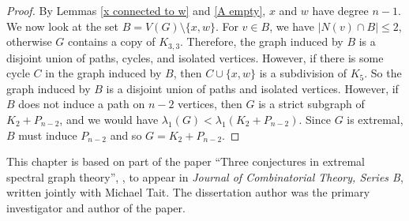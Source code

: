 \begin{proof}
By Lemmas \ref{x connected to w} and \ref{A empty}, $x$ and $w$ have degree $n-1$. We now look at the set $B = V(G) \setminus \{x,w\}$. For $v\in B$, we have $|N(v) \cap B| \leq 2$, otherwise $G$ contains a copy of $K_{3,3}$. Therefore, the graph induced by $B$ is a disjoint union of paths, cycles, and isolated vertices. However, if there is some cycle $C$ in the graph induced by $B$, then $C \cup\{x,w\}$ is a subdivision of $K_5$. So the graph induced by $B$ is a disjoint union of paths and isolated vertices. However, if $B$ does not induce a path on $n-2$ vertices, then $G$ is a strict subgraph of $K_2 + P_{n-2}$, and we would have $\lambda_1(G) < \lambda_1(K_2 + P_{n-2})$. Since $G$ is extremal, $B$ must induce $P_{n-2}$ and so $G = K_2 + P_{n-2}$.
\end{proof}


This chapter is based on part of the paper ``Three conjectures in extremal spectral graph theory'',
 \cite{TaitTobin2017}, to appear in \textit{Journal of Combinatorial Theory, Series B},
written jointly with Michael Tait.  The dissertation
author was the primary investigator and author of the paper.
